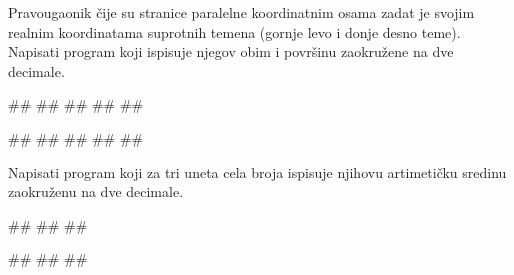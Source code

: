 \begin{Exercise}[label=p1_13] 
Pravougaonik čije su stranice paralelne koordinatnim osama zadat je svojim realnim koordinatama suprotnih temena (gornje levo i donje desno teme). Napisati program koji ispisuje njegov obim i površinu zaokružene na dve decimale. 

\begin{maxitest}
\begin{upotreba}{1}
#\naslovInt#
##
##
##
##
\end{upotreba}
\end{maxitest}

\begin{maxitest}
\begin{upotreba}{2}
#\naslovInt#
##
##
##
##
\end{upotreba}
\end{maxitest}
\end{Exercise}


\begin{Exercise}[label=v1.1_09] 
Napisati program koji za tri uneta cela broja ispisuje njihovu artimetičku sredinu zaokruženu na dve decimale.

\begin{miditest}
\begin{upotreba}{1}
#\naslovInt#
##
##
\end{upotreba}
\end{miditest}
\begin{miditest}
\begin{upotreba}{2}
#\naslovInt#
##
##
\end{upotreba}
\end{miditest}

\end{Exercise}
\ifresenja
\begin{Answer}[ref=v1.1_09]
\end{Answer}
\fi








